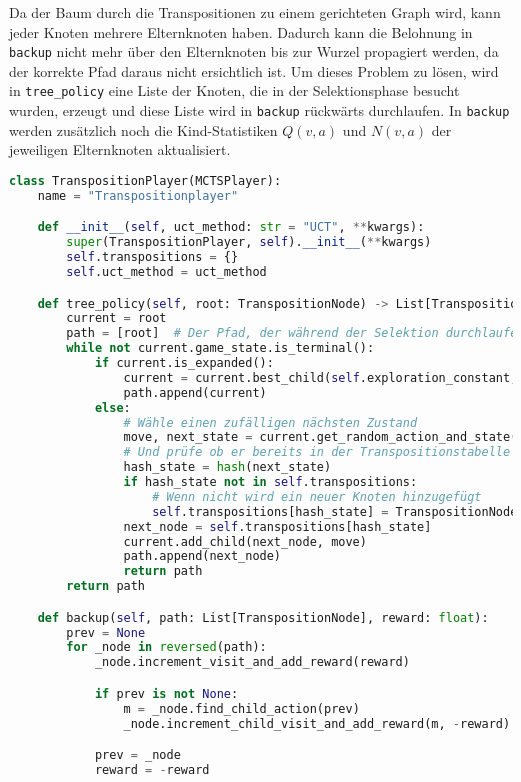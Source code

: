 Da der Baum durch die Transpositionen zu einem gerichteten Graph wird, kann jeder Knoten mehrere Elternknoten haben.
Dadurch kann die Belohnung in \verb|backup| nicht mehr über den Elternknoten bis zur Wurzel propagiert werden, da der korrekte Pfad daraus nicht ersichtlich ist.
Um dieses Problem zu lösen, wird in \verb|tree_policy| eine Liste der Knoten, die in der Selektionsphase besucht wurden, erzeugt und diese Liste wird in \verb|backup| rückwärts durchlaufen.
In \verb|backup| werden zusätzlich noch die Kind-Statistiken $Q(v,a)$ und $N(v,a)$ der jeweiligen Elternknoten aktualisiert.

\begin{lstlisting}[language=Python,label={lst:transposition-player}]
class TranspositionPlayer(MCTSPlayer):
    name = "Transpositionplayer"

    def __init__(self, uct_method: str = "UCT", **kwargs):
        super(TranspositionPlayer, self).__init__(**kwargs)
        self.transpositions = {}
        self.uct_method = uct_method

    def tree_policy(self, root: TranspositionNode) -> List[TranspositionNode]:
        current = root
        path = [root]  # Der Pfad, der während der Selektion durchlaufen wird
        while not current.game_state.is_terminal():
            if current.is_expanded():
                current = current.best_child(self.exploration_constant, uct_method=self.uct_method)
                path.append(current)
            else:
                # Wähle einen zufälligen nächsten Zustand
                move, next_state = current.get_random_action_and_state()
                # Und prüfe ob er bereits in der Transpositionstabelle enthalten ist
                hash_state = hash(next_state)
                if hash_state not in self.transpositions:
                    # Wenn nicht wird ein neuer Knoten hinzugefügt
                    self.transpositions[hash_state] = TranspositionNode(game_state=next_state, parent=current)
                next_node = self.transpositions[hash_state]
                current.add_child(next_node, move)
                path.append(next_node)
                return path
        return path

    def backup(self, path: List[TranspositionNode], reward: float):
        prev = None
        for _node in reversed(path):
            _node.increment_visit_and_add_reward(reward)

            if prev is not None:
                m = _node.find_child_action(prev)
                _node.increment_child_visit_and_add_reward(m, -reward)

            prev = _node
            reward = -reward
\end{lstlisting}

